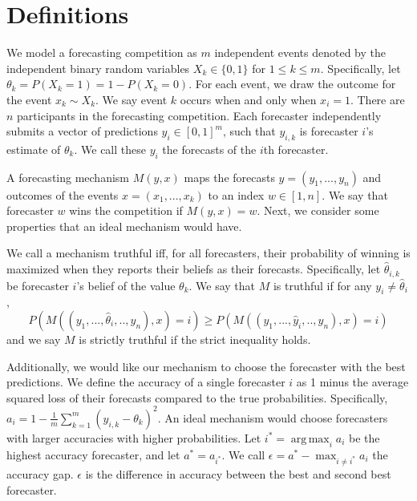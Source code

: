 \documentclass[letterpaper,12pt]{article}
\renewenvironment{abstract}
 {
  \begin{center}
  \vspace{3em} \bfseries \abstractname\vspace{0em}\vspace{0pt}
  \end{center}
  \list{}{%
    \setlength{\leftmargin}{20mm}%
    \setlength{\rightmargin}{\leftmargin}%
  }%
  \item\relax}
 {\endlist}
\DeclareMathOperator*{\argmax}{arg\,max}
\newcommand{\1}{\mathbbm{1}}
\begin{document}


 


\section{Definitions}
We model a forecasting competition as $m$ independent events denoted by the independent binary random variables $X_k \in \{0, 1\}$ for $1 \leq k \leq m$. Specifically, let $\theta_k = P(X_k = 1) = 1 - P(X_k = 0)$. For each event, we draw the outcome for the event $x_k \sim X_k$. We say event $k$ occurs when and only when $x_i = 1$. There are $n$ participants in the forecasting competition. Each forecaster independently submits a vector of predictions $y_i \in [0, 1]^m$, such that $y_{i, k}$ is forecaster $i$'s estimate of $\theta_k$. We call these $y_i$ the forecasts of the $i$th forecaster.

A forecasting mechanism $M(y, x)$ maps the forecasts $y = (y_1, ..., y_n)$ and outcomes of the events $x = (x_1, ..., x_k)$ to an index $w \in [1, n]$. We say that forecaster $w$ wins the competition if $M(y, x) = w$. Next, we consider some properties that an ideal mechanism would have. 

We call a mechanism truthful iff, for all forecasters, their probability of winning is maximized when they reports their beliefs as their forecasts. Specifically, let $\hat{\theta}_{i, k}$ be forecaster $i$'s belief of the value $\theta_k$. We say that $M$ is truthful if for any $y_i \neq \hat \theta_{i}$,
\[ P(M( (y_1, ..., \hat \theta_i, .., y_n), x ) = i) \geq  P(M( (y_1, ..., \hat y_i, .., y_n), x ) = i)\]
and we say $M$ is strictly truthful if the strict inequality holds. 

Additionally, we would like our mechanism to choose the forecaster with the best predictions. We define the accuracy of a single forecaster $i$ as 1 minus the average squared loss of their forecasts compared to the true probabilities. Specifically, $a_i = 1 - \frac{1}{m}\sum_{k=1}^m (y_{i, k} - \theta_k)^2$. An ideal mechanism would choose forecasters with larger accuracies with higher probabilities. Let $i^* = \argmax_i a_i$ be the highest accuracy forecaster, and let $a^* = a_{i^*}$. We call $\epsilon = a^* - \max_{i \neq i^*} a_i$ the accuracy gap. $\epsilon$ is the difference in accuracy between the best and second best forecaster. 
\end{document}
